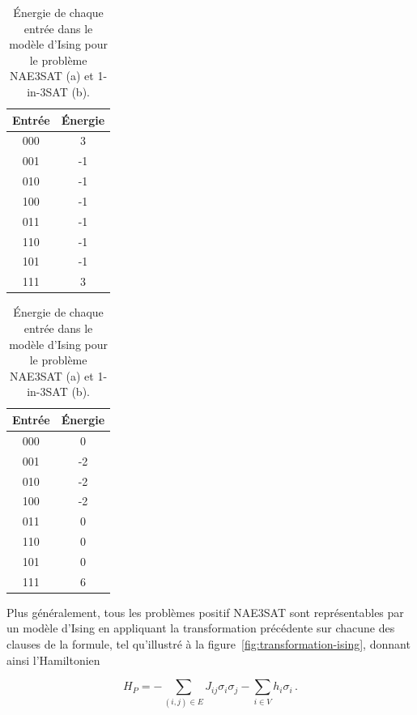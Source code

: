 \begin{table}[h]
    \centering
    \begin{subtable}{0.4\textwidth}
        \centering
        \begin{tabular}{c c}
            \hline
            Entrée & Énergie \\
            \hline
            000 & 3 \\
            001 & -1 \\
            010 & -1 \\
            100 & -1 \\
            011 & -1 \\
            110 & -1 \\
            101 & -1 \\
            111 & 3 \\
            \hline
        \end{tabular}
        \caption{}
        \label{tab:energie-nae3sat}
    \end{subtable}
    \begin{subtable}{0.4\textwidth}
        \centering
        \begin{tabular}{c c}
            \hline
            Entrée & Énergie \\
            \hline
            000 & 0 \\
            001 & -2 \\
            010 & -2 \\
            100 & -2 \\
            011 & 0 \\
            110 & 0 \\
            101 & 0 \\
            111 & 6 \\
            \hline
        \end{tabular}
        \caption{}
        \label{tab:energie-1in3sat}
    \end{subtable}
    \caption{Énergie de chaque entrée dans le modèle d'Ising pour le problème NAE3SAT (a) et 1-in-3SAT (b).}
\end{table}

Plus généralement, tous les problèmes positif NAE3SAT sont représentables par un modèle d'Ising en appliquant la transformation précédente sur chacune des clauses de la formule, tel qu'illustré à la figure~\ref{fig:transformation-ising}, donnant ainsi l'Hamiltonien 

\begin{equation}
    H_P = - \sum_{(i,j) \in E} J_{ij} \sigma_i \sigma_j - \sum_{i \in V} h_i \sigma_i \,.
\end{equation}

